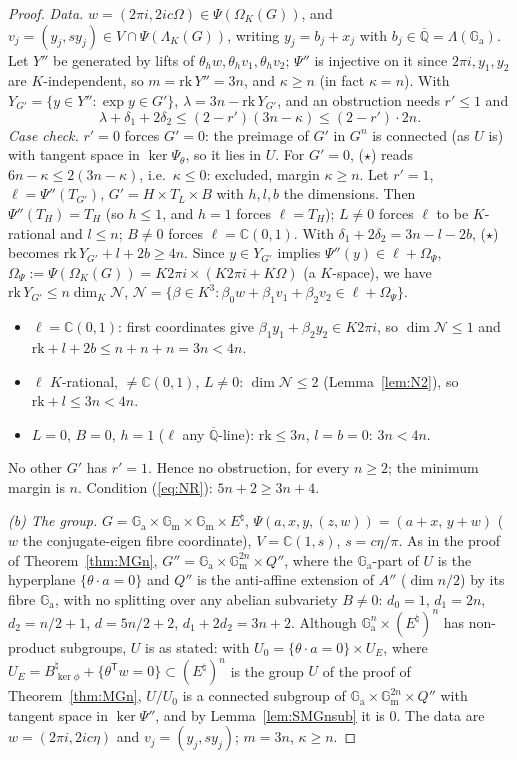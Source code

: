 \documentclass[11pt]{amsart}
\theoremstyle{definition}
\newcommand{\Qb}{\overline{\mathbb{Q}}}
\newcommand{\C}{\mathbb{C}}
\newcommand{\Ga}{\mathbb{G}_{\mathrm a}}
\newcommand{\Gm}{\mathbb{G}_{\mathrm m}}
\begin{document}
\begin{proof}
\emph{Data.} $w=(2\pi i,2ic\Omega)\in\Psi(\Omega_K(G))$, and $v_j=(y_j,sy_j)\in V\cap\Psi(\Lambda_K(G))$, writing $y_j=b_j+x_j$
with $b_j\in\Qb=\Lambda(\Ga)$. Let $Y''$ be generated by lifts of $\theta_hw,\theta_hv_1,\theta_hv_2$; $\Psi''$ is injective on
it since $2\pi i,y_1,y_2$ are $K$-independent, so $m=\mathrm{rk}\,Y''=3n$, and $\kappa\ge n$ (in fact $\kappa=n$). With
$Y_{G'}=\{y\in Y'':\exp y\in G'\}$, $\lambda=3n-\mathrm{rk}\,Y_{G'}$, and an obstruction needs $r'\le1$ and
\[
\lambda+\delta_1+2\delta_2\le(2-r')(3n-\kappa)\le(2-r')\cdot2n .\tag{$\star$}
\]
\emph{Case check.} $r'=0$ forces $G'=0$: the preimage of $G'$ in $G^n$ is connected (as $U$ is) with tangent space in
$\ker\Psi_\theta$, so it lies in $U$. For $G'=0$, ($\star$) reads $6n-\kappa\le2(3n-\kappa)$, i.e.\ $\kappa\le0$: excluded, margin
$\kappa\ge n$. Let $r'=1$, $\ell=\Psi''(T_{G'})$, $G'=H\times T_L\times B$ with $h,l,b$ the dimensions. Then $\Psi''(T_H)=T_H$
(so $h\le1$, and $h=1$ forces $\ell=T_H$); $L\ne0$ forces $\ell$ to be $K$-rational and $l\le n$; $B\ne0$ forces
$\ell=\C(0,1)$. With $\delta_1+2\delta_2=3n-l-2b$, ($\star$) becomes $\mathrm{rk}\,Y_{G'}+l+2b\ge4n$. Since
$y\in Y_{G'}$ implies $\Psi''(y)\in\ell+\Omega_\Psi$, $\Omega_\Psi:=\Psi(\Omega_K(G))=K2\pi i\times(K2\pi i+K\Omega)$ (a
$K$-space), we have $\mathrm{rk}\,Y_{G'}\le n\dim_K\mathcal N$, $\mathcal N=\{\beta\in K^3:\beta_0w+\beta_1v_1+\beta_2v_2\in
\ell+\Omega_\Psi\}$.
\begin{itemize}
\item $\ell=\C(0,1)$: first coordinates give $\beta_1y_1+\beta_2y_2\in K2\pi i$, so $\dim\mathcal N\le1$ and
$\mathrm{rk}+l+2b\le n+n+n=3n<4n$.
\item $\ell$ $K$-rational, $\ne\C(0,1)$, $L\ne0$: $\dim\mathcal N\le2$ (Lemma~\ref{lem:N2}), so $\mathrm{rk}+l\le3n<4n$.
\item $L=0$, $B=0$, $h=1$ ($\ell$ any $\Qb$-line): $\mathrm{rk}\le3n$, $l=b=0$: $3n<4n$.
\end{itemize}
No other $G'$ has $r'=1$. Hence no obstruction, for every $n\ge2$; the minimum margin is $n$. Condition (\ref{eq:NR}):
$5n+2\ge3n+4$.

\emph{(b) The group.} $G=\Ga\times\Gm\times\Gm\times E^\natural$, $\Psi(a,x,y,(z,w))=(a+x,\,y+w)$ ($w$ the conjugate-eigen
fibre coordinate), $V=\C(1,s)$, $s=c\eta/\pi$. As in the proof of Theorem~\ref{thm:MGn}, $G''=\Ga\times\Gm^{2n}\times Q''$, where the
$\Ga$-part of $U$ is the hyperplane $\{\theta\cdot a=0\}$ and $Q''$ is the anti-affine extension of $A''$ ($\dim n/2$) by
its fibre $\Ga$, with no splitting over any abelian subvariety $B\neq0$: $d_0=1$, $d_1=2n$, $d_2=n/2+1$, $d=5n/2+2$,
$d_1+2d_2=3n+2$. Although $\Ga^n\times(E^\natural)^n$ has non-product subgroups, $U$ is as stated: with
$U_0=\{\theta\cdot a=0\}\times U_E$, where $U_E=B^\natural_{\ker\phi}+\{\theta^{\mathsf T}w=0\}\subset(E^\natural)^n$ is the
group $U$ of the proof of Theorem~\ref{thm:MGn}, $U/U_0$ is a connected subgroup of $\Ga\times\Gm^{2n}\times Q''$ with tangent space in
$\ker\Psi''$, and by Lemma~\ref{lem:SMGnsub} it is $0$. The data are $w=(2\pi i,2ic\eta)$ and $v_j=(y_j,sy_j)$; $m=3n$,
$\kappa\ge n$.


\end{proof}
\end{document}
